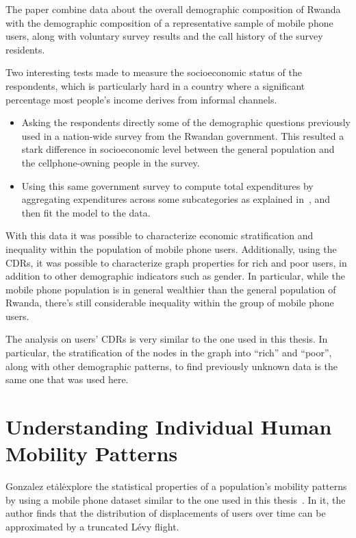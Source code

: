 The paper combine data about the overall demographic composition of Rwanda with the demographic composition of a representative sample of mobile phone users, along with voluntary survey results and the call history of the survey residents.

Two interesting tests made to measure the socioeconomic status of the respondents, which is particularly hard in a country where a significant percentage most people's income derives from informal channels.

\begin{itemize}
	\item Asking the respondents directly some of the demographic questions previously used in a nation-wide survey from the Rwandan government. This resulted a stark difference in socioeconomic level between the general population and the cellphone-owning people in the survey.
	\item Using this same government survey to compute total expenditures by aggregating expenditures across some subcategories as explained in~\cite{deaton2002}, and then fit the model to the data.
\end{itemize}

With this data it was possible to characterize economic stratification and inequality within the population of mobile phone users. Additionally, using the CDRs, it was possible to characterize graph properties for rich and poor users, in addition to other demographic indicators such as gender. In particular, while the mobile phone population is in general wealthier than the general population of Rwanda, there's still considerable inequality within the group of mobile phone users.

The analysis on users' CDRs is very similar to the one used in this thesis.
In particular, the stratification of the nodes in the graph into ``rich'' and ``poor'', along with other demographic patterns, to find previously unknown data is the same one that was used here.

\section{Understanding Individual Human Mobility Patterns}

Gonzalez et\. al\. explore the statistical properties of a population's mobility patterns by using a mobile phone dataset similar to the one used in this thesis~\cite{gonzalez2008understanding}. In it, the author finds that the distribution of displacements of users over time can be approximated by a truncated Lévy flight\cite{mandelbrot1982fractal}.

